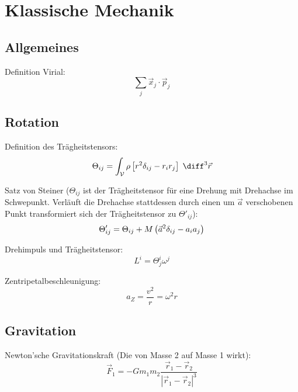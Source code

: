 \documentclass[11pt]{article}
\numberwithin{equation}{section}
\begin{document}
      \newpage
    \section{Klassische Mechanik}

      \subsection{Allgemeines}
        Definition Virial:
        \begin{equation}
          \sum_j \vec{x}_j\cdot\vec{p}_j
        \end{equation}

      \subsection{Rotation}
        Definition des Trägheitstensors:
        \begin{equation}
          \Theta_{ij}=\int_{\mathcal{V}} \rho \left[r^2\delta_{ij}-r_i r_j\right] \;\diff^3\vec{r}
        \end{equation}

        Satz von Steiner ($\Theta_{ij}$ ist der Trägheitstensor für eine Drehung mit Drehachse im Schwepunkt. Verläuft die Drehachse stattdessen durch einen um $\vec{a}$ verschobenen Punkt transformiert sich der Trägheitstensor zu $\Theta'_{ij}$):
        \begin{equation}
          \Theta'_{ij} = \Theta_{ij} + M\left( \vec{a}^2\delta_{ij} - a_i a_j \right)
        \end{equation}

        Drehimpuls und Trägheitstensor:
        \begin{equation}
          L^i = \Theta^i_j \omega^j
        \end{equation}

        Zentripetalbeschleunigung:
        \begin{equation}
          a_Z = \frac{v^2}{r} = \omega^2 r
        \end{equation}

      \subsection{Gravitation}
        Newton'sche Gravitationskraft (Die von Masse 2 auf Masse 1 wirkt):
        \begin{equation}
          \vec{F}_1 = - G m_1 m_2 \frac{\vec{r}_1-\vec{r}_2}{\left|\vec{r}_1-\vec{r}_2\right|^3}
        \end{equation}
\end{document}
